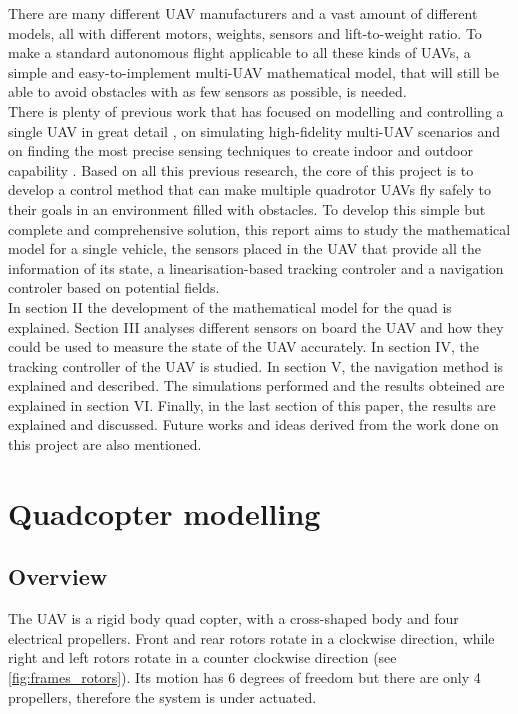 \documentclass[journal]{IEEEtran}
\begin{document}
	There are many different UAV manufacturers and a vast amount of different models, all with different motors, weights, sensors and lift-to-weight ratio. To make a standard autonomous flight applicable to all these kinds of UAVs, a simple and easy-to-implement multi-UAV mathematical model, that will still be able to avoid obstacles with as few sensors as possible, is needed.\\
	
	 There is plenty of previous work that has focused on modelling and controlling a single UAV in great detail \cite{intro_nolinear_model_control}, on simulating high-fidelity multi-UAV scenarios \cite{intro_3d_unity} and on finding the most precise sensing techniques to create indoor and outdoor capability \cite{intro_indoor_sensing}. Based on all this previous research, the core of this project is to develop a control method that can make multiple quadrotor UAVs fly safely to their goals in an environment filled with obstacles. To develop this simple but complete and comprehensive solution, this report aims to study the mathematical model for a single vehicle, the sensors placed in the UAV that provide all the information of its state, a linearisation-based tracking controler and a navigation controler based on potential fields. \\
	
	In section II the development of the mathematical model for the quad is explained. Section III analyses different sensors on board the UAV and how they could be used to measure the state of the UAV accurately. In section IV, the tracking controller of the UAV is studied. In section V, the navigation method  is explained and described. The simulations performed and the results obteined are explained in section VI. Finally, in the last section of this paper, the results are explained and discussed. Future works and ideas derived from the work done on this project are also mentioned.

	\hfill 	
	
	
	\section{Quadcopter modelling}
	\subsection{Overview}
	
	The UAV is a rigid body quad copter, with a cross-shaped body and four electrical propellers. Front and rear rotors rotate in a clockwise direction, while right and left rotors rotate in a counter clockwise direction (see \figurename  \ref{fig:frames_rotors}). Its motion has 6 degrees of freedom but there are only 4 propellers, therefore the system is under actuated. 
	
\end{document}
